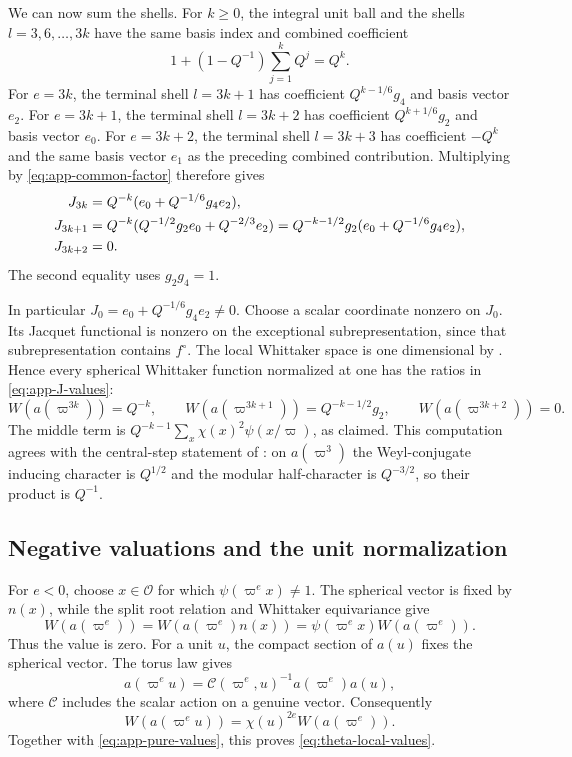 We can now sum the shells.  For \(k\ge0\), the integral unit ball
and the shells \(l=3,6,\ldots,3k\) have the same basis index and
combined coefficient
\[
 1+(1-Q^{-1})\sum_{j=1}^{k}Q^j=Q^k.
\]
For \(e=3k\), the terminal shell \(l=3k+1\) has coefficient
\(Q^{k-1/6}g_4\) and basis vector \(e_2\).  For \(e=3k+1\), the
terminal shell \(l=3k+2\) has coefficient
\(Q^{k+1/6}g_2\) and basis vector \(e_0\).  For \(e=3k+2\), the
terminal shell \(l=3k+3\) has coefficient \(-Q^k\) and the same
basis vector \(e_1\) as the preceding combined contribution.
Multiplying by \eqref{eq:app-common-factor} therefore gives
\begin{align}
 J_{3k}
   &=Q^{-k}(e_0+Q^{-1/6}g_4e_2),\notag\\
 J_{3k+1}
   &=Q^{-k}(Q^{-1/2}g_2e_0+Q^{-2/3}e_2)
     =Q^{-k-1/2}g_2(e_0+Q^{-1/6}g_4e_2),\notag\\
 J_{3k+2}&=0.                                      \label{eq:app-J-values}
\end{align}
The second equality uses \(g_2g_4=1\).

In particular \(J_0=e_0+Q^{-1/6}g_4e_2\ne0\).  Choose a scalar
coordinate nonzero on \(J_0\).  Its Jacquet functional is nonzero on
the exceptional subrepresentation, since that subrepresentation
contains \(f^\circ\).  The local Whittaker space is one dimensional
by \cite[Corollary~I.3.6, p.~79]{KP84}.  Hence every spherical Whittaker
function normalized at one has the ratios in
\eqref{eq:app-J-values}:
\begin{equation}\label{eq:app-pure-values}
 W(a(\varpi^{3k}))=Q^{-k},\qquad
 W(a(\varpi^{3k+1}))=Q^{-k-1/2}g_2,\qquad
 W(a(\varpi^{3k+2}))=0.
\end{equation}
The middle term is
\(Q^{-k-1}\sum_x\chi(x)^2\psi(x/\varpi)\), as claimed.
This computation agrees with the central-step statement of
\cite[Theorem~I.4.3, p.~87]{KP84}: on \(a(\varpi^3)\) the Weyl-conjugate
inducing character is \(Q^{1/2}\) and the modular half-character is
\(Q^{-3/2}\), so their product is \(Q^{-1}\).

\subsection{Negative valuations and the unit normalization}

For \(e<0\), choose \(x\in\mathcal O\) for which
\(\psi(\varpi^e x)\ne1\).  The spherical vector is fixed by
\(n(x)\), while the split root relation and Whittaker equivariance
give
\[
 W(a(\varpi^e))
 =W(a(\varpi^e)n(x))
 =\psi(\varpi^e x)W(a(\varpi^e)).
\]
Thus the value is zero.  For a unit \(u\), the compact section of
\(a(u)\) fixes the spherical vector.  The torus law gives
\[
 a(\varpi^e u)=\mathcal C(\varpi^e,u)^{-1}a(\varpi^e)a(u),
\]
where \(\mathcal C\) includes the scalar action on a genuine vector.
Consequently
\begin{equation}\label{eq:app-unit-rule}
 W(a(\varpi^e u))=\chi(u)^{2e}W(a(\varpi^e)).
\end{equation}
Together with \eqref{eq:app-pure-values}, this proves
\eqref{eq:theta-local-values}.


